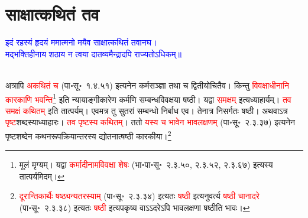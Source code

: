 \section[साक्षात्कथितं तव]{साक्षात्कथितं तव}
\centering\textcolor{blue}{इदं रहस्यं हृदयं ममात्मनो मयैव साक्षात्कथितं तवानघ।\nopagebreak\\
मद्भक्तिहीनाय शठाय न त्वया दातव्यमैन्द्रादपि राज्यतोऽधिकम्॥}\nopagebreak\\
\\
\begin{sloppypar}\justifying\noindent\hspace{10mm} अत्रापि \textcolor{red}{अकथितं च} (पा॰सू॰~१.४.५१) इत्यनेन कर्म\-सञ्ज्ञा तथा च द्वितीयोचितैव। किन्तु \textcolor{red}{विवक्षाधीनानि कारकाणि भवन्ति}\footnote{मूलं मृग्यम्। यद्वा \textcolor{red}{कर्मादीनामविवक्षा शेषः} (भा॰पा॰सू॰~२.३.५०, २.३.५२, २.३.६७) इत्यस्य तात्पर्यमिदम्।} इति न्यायाङ्गीकारेण कर्मणि सम्बन्ध\-विवक्षया षष्ठी। यद्वा \textcolor{red}{समक्षम्‌} इत्यध्याहार्यम्। \textcolor{red}{तव समक्षं कथितम्‌} इति तात्पर्यम्। एवमत्र तु सुतरां सम्बन्धो निर्बाध एव। तेनात्र निसर्गतः षष्ठी।
अथवाऽत्र \textcolor{red}{पृष्ट}\-शब्दस्याध्याहारः। \textcolor{red}{तव पृष्टस्य कथितम्‌}। ततो \textcolor{red}{यस्य च भावेन भाव\-लक्षणम्‌} (पा॰सू॰~२.३.३७) इत्यनेन पृष्ट\-शब्देन कथन\-रूप\-क्रियान्तरस्य द्योतनात्षष्ठी कारकीया।\footnote{\textcolor{red}{दूरान्तिकार्थैः षष्ठ्यन्यतरस्याम्‌} (पा॰सू॰~२.३.३४) इत्यतः \textcolor{red}{षष्ठी} इत्यनुवर्त्य \textcolor{red}{षष्ठी चानादरे} (पा॰सू॰~२.३.३८) इत्यतः \textcolor{red}{षष्ठी} इत्यपकृष्य वाऽऽदरेऽपि भावलक्षणा षष्ठीति भावः।}\end{sloppypar}
